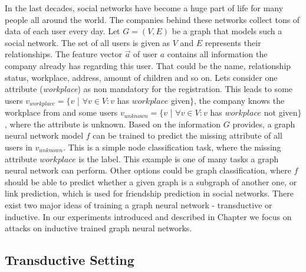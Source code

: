     In the last decades, social networks have become a huge part of life for many people all around the world.
    The companies behind these networks collect tons of data of each user every day.
    Let $G = (V, E)$ be a graph that models such a social network. 
    The set of all users is given as $V$ and $E$ represents their relationships.
    The feature vector $\overrightarrow{a}$ of user $a$ contains all information the company already has regarding this user.
    That could be the name, relationship status, workplace, address, amount of children and so on.
    Lets consider one attribute (\emph{workplace}) as non mandatory for the registration.
    This leads to some users $v_{workplace} = \{v $ | $ \forall v \in V: v$ has $workplace$ given$\}$, the company knows the workplace from and some users $v_{unknown} = \{v $ | $ \forall v \in V: v$ has $workplace$ not given$\}$, where the attribute is unknown.
    Based on the information $G$ provides, a graph neural network model $f$ can be trained to predict the missing attribute of all users in $v_{unknown}$.
    This is a simple node classification task, where the missing attribute $workplace$ is the label.
    This example is one of many tasks a graph neural network can perform.
    Other options could be graph classification, where $f$ should be able to predict whether a given graph is a subgraph of another one, or link prediction, which is used for friendship prediction in social networks.
    There exist two major ideas of training a graph neural network - transductive or inductive.
    In our experiments introduced and described in Chapter  we focus on attacks on inductive trained graph neural networks. 

    \subsection*{Transductive Setting}

